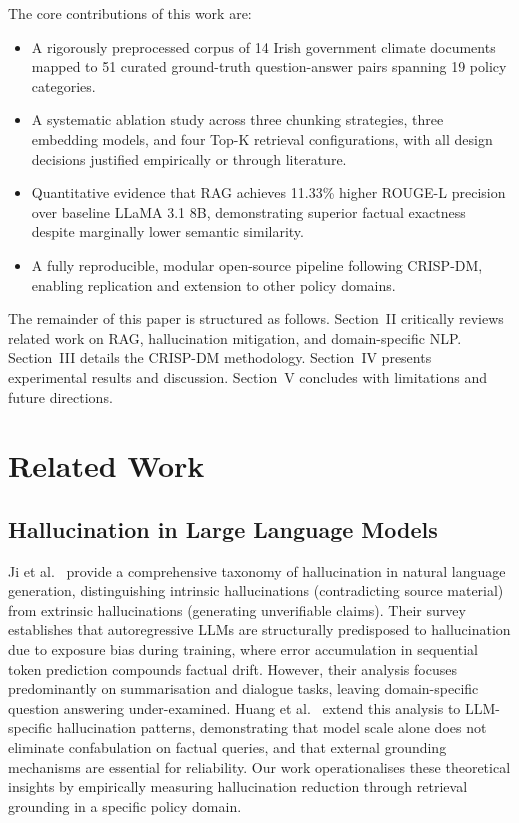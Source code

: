 \documentclass[conference]{IEEEtran}
\begin{document}
The core contributions of this work are:
\begin{itemize}[noitemsep]
    \item A rigorously preprocessed corpus of 14 Irish government climate documents mapped to 51 curated ground-truth question-answer pairs spanning 19 policy categories.
    \item A systematic ablation study across three chunking strategies, three embedding models, and four Top-K retrieval configurations, with all design decisions justified empirically or through literature.
    \item Quantitative evidence that RAG achieves 11.33\% higher ROUGE-L precision over baseline LLaMA 3.1 8B, demonstrating superior factual exactness despite marginally lower semantic similarity.
    \item A fully reproducible, modular open-source pipeline following CRISP-DM, enabling replication and extension to other policy domains.
\end{itemize}

The remainder of this paper is structured as follows. Section~II critically reviews related work on RAG, hallucination mitigation, and domain-specific NLP. Section~III details the CRISP-DM methodology. Section~IV presents experimental results and discussion. Section~V concludes with limitations and future directions.

\section{Related Work}

\subsection{Hallucination in Large Language Models}

Ji et al.~\cite{ji2023survey} provide a comprehensive taxonomy of hallucination in natural language generation, distinguishing intrinsic hallucinations (contradicting source material) from extrinsic hallucinations (generating unverifiable claims). Their survey establishes that autoregressive LLMs are structurally predisposed to hallucination due to exposure bias during training, where error accumulation in sequential token prediction compounds factual drift. However, their analysis focuses predominantly on summarisation and dialogue tasks, leaving domain-specific question answering under-examined. Huang et al.~\cite{huang2023survey} extend this analysis to LLM-specific hallucination patterns, demonstrating that model scale alone does not eliminate confabulation on factual queries, and that external grounding mechanisms are essential for reliability. Our work operationalises these theoretical insights by empirically measuring hallucination reduction through retrieval grounding in a specific policy domain.
\end{document}

